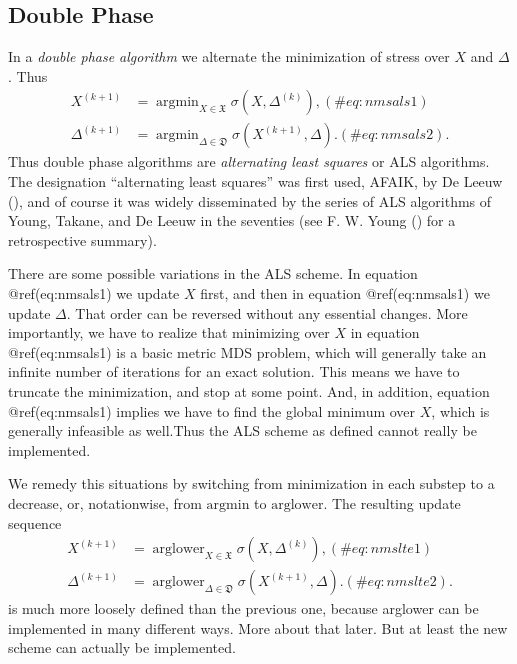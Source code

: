 \documentclass[
  12pt,
  letterpaper,
  DIV=11,
  numbers=noendperiod]{scrreprt}
\theoremstyle{remark}
\begin{document}
\subsection{Double Phase}\label{double-phase}

In a \emph{double phase algorithm} we alternate the minimization of
stress over \(X\) and \(\Delta\). Thus \begin{align}
X^{(k+1)}&=\mathop{\text{argmin}}_{X\in\mathfrak{X}}\sigma(X,\Delta^{(k)}),(\#eq:nmsals1)\\
\Delta^{(k+1)}&=\mathop{\text{argmin}}_{\Delta\in\mathfrak{D}}\sigma(X^{(k+1)},\Delta).(\#eq:nmsals2).
\end{align} Thus double phase algorithms are \emph{alternating least
squares} or ALS algorithms. The designation ``alternating least
squares'' was first used, AFAIK, by De Leeuw
(), and of course it was widely
disseminated by the series of ALS algorithms of Young, Takane, and De
Leeuw in the seventies (see F. W. Young ()
for a retrospective summary).

There are some possible variations in the ALS scheme. In equation
@ref(eq:nmsals1) we update \(X\) first, and then in equation
@ref(eq:nmsals1) we update \(\Delta\). That order can be reversed
without any essential changes. More importantly, we have to realize that
minimizing over \(X\) in equation @ref(eq:nmsals1) is a basic metric MDS
problem, which will generally take an infinite number of iterations for
an exact solution. This means we have to truncate the minimization, and
stop at some point. And, in addition, equation @ref(eq:nmsals1) implies
we have to find the global minimum over \(X\), which is generally
infeasible as well.Thus the ALS scheme as defined cannot really be
implemented.

We remedy this situations by switching from minimization in each substep
to a decrease, or, notationwise, from \(\text{argmin}\) to
\(\text{arglower}\). The resulting update sequence \begin{align}
X^{(k+1)}&=\mathop{\text{arglower}}_{X\in\mathfrak{X}}\sigma(X,\Delta^{(k)}),(\#eq:nmslte1)\\
\Delta^{(k+1)}&=\mathop{\text{arglower}}_{\Delta\in\mathfrak{D}}\sigma(X^{(k+1)},\Delta).(\#eq:nmslte2).
\end{align} is much more loosely defined than the previous one, because
arglower can be implemented in many different ways. More about that
later. But at least the new scheme can actually be implemented.
\end{document}
